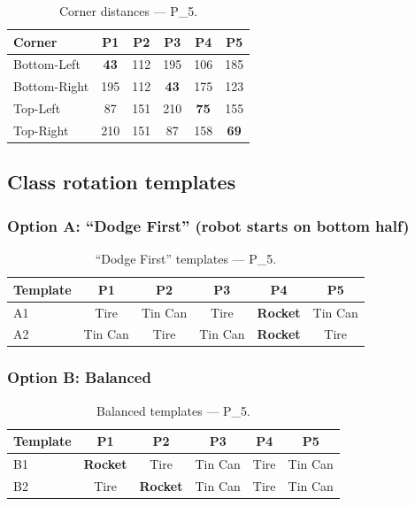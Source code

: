 \documentclass[a4]{article}
\begin{document}
\begin{table}[H]
\centering
\begin{tabular}{lccccc}
\toprule
\textbf{Corner} & \textbf{P1} & \textbf{P2} & \textbf{P3} & \textbf{P4} & \textbf{P5} \\
\midrule
Bottom-Left & \textbf{43} & 112 & 195 & 106 & 185 \\
Bottom-Right & 195 & 112 & \textbf{43} & 175 & 123 \\
Top-Left & 87 & 151 & 210 & \textbf{75} & 155 \\
Top-Right & 210 & 151 & 87 & 158 & \textbf{69} \\
\bottomrule
\end{tabular}
\caption{Corner distances --- P\_5.}
\end{table}

\subsection*{Class rotation templates}

\subsubsection*{Option A: ``Dodge First'' (robot starts on bottom half)}

\begin{table}[H]
\centering
\begin{tabular}{lccccc}
\toprule
\textbf{Template} & \textbf{P1} & \textbf{P2} & \textbf{P3} & \textbf{P4} & \textbf{P5} \\
\midrule
A1 & Tire & Tin Can & Tire & \textbf{Rocket} & Tin Can \\
A2 & Tin Can & Tire & Tin Can & \textbf{Rocket} & Tire \\
\bottomrule
\end{tabular}
\caption{``Dodge First'' templates --- P\_5.}
\end{table}

\subsubsection*{Option B: Balanced}

\begin{table}[H]
\centering
\begin{tabular}{lccccc}
\toprule
\textbf{Template} & \textbf{P1} & \textbf{P2} & \textbf{P3} & \textbf{P4} & \textbf{P5} \\
\midrule
B1 & \textbf{Rocket} & Tire & Tin Can & Tire & Tin Can \\
B2 & Tire & \textbf{Rocket} & Tin Can & Tire & Tin Can \\
\bottomrule
\end{tabular}
\caption{Balanced templates --- P\_5.}
\end{table}
\end{document}
